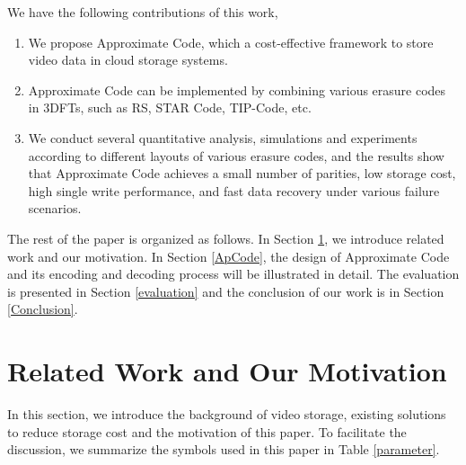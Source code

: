 \documentclass[sigconf]{acmart}
\begin{document}
We have the following contributions of this work,
\begin{enumerate}
\item We propose Approximate Code, which a cost-effective framework to store video data in cloud storage systems.
\item Approximate Code can be implemented by combining various erasure codes in 3DFTs, such as RS, STAR Code, TIP-Code, etc.
\item We conduct several quantitative analysis, simulations and experiments according to different layouts of various erasure codes, and the results show that Approximate Code achieves a small number of parities, low storage cost, high single write performance, and fast data recovery under various failure scenarios.
\end{enumerate}

The rest of the paper is organized as follows. In Section \ref{RelatedWork}, we introduce related work and our motivation.
In Section \ref{ApCode}, the design of Approximate Code and its encoding and decoding process will be illustrated in detail.
The evaluation is presented in Section \ref{evaluation} and the conclusion of our work is in Section \ref{Conclusion}.

\section{Related Work and Our Motivation}\label{RelatedWork}
In this section, we introduce the background of video storage, existing solutions to reduce storage cost and the motivation of this paper.
To facilitate the discussion, we summarize the symbols used in this paper in Table \ref{parameter}.
\end{document}
